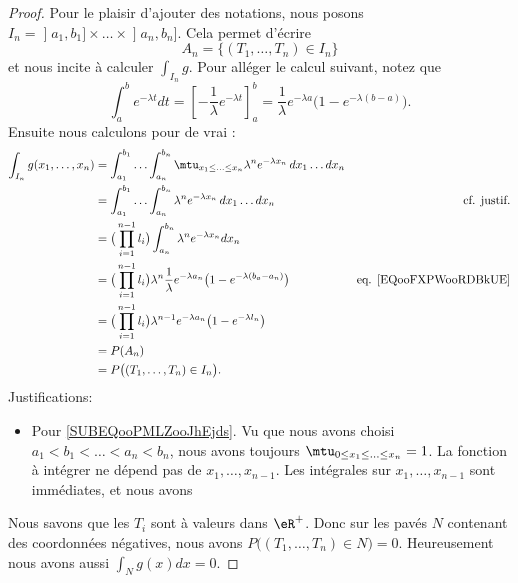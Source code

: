 \begin{proof}
	Pour le plaisir d'ajouter des notations, nous posons \( I_n=\mathopen] a_1 , b_1 \mathclose]\times \ldots\times\mathopen] a_n , b_n \mathclose]\). Cela permet d'écrire
	\begin{equation}
		A_n=\{ (T_1,\ldots,T_n)\in I_n \}
	\end{equation}
	et nous incite à calculer \( \int_{I_n}g\). Pour alléger le calcul suivant, notez que
	\begin{equation}	\label{EQooFXPWooRDBkUE}
		\int_a^be^{-\lambda t}dt=\left[  -\frac{1}{ \lambda}e^{-\lambda t}  \right]_a^b=\frac{1}{ \lambda}e^{-\lambda a}\big( 1-e^{-\lambda(b-a)} \big).
	\end{equation}
	Ensuite nous calculons pour de vrai :
	\begin{subequations}
		\begin{align}
			\int_{I_n}g(x_1,\ldots, x_n) & =\int_{a_1}^{b_1}\ldots\int_{a_n}^{b_n}\mtu_{x_1\leq \ldots\leq x_n}\lambda^n e^{-\lambda x_n}\,dx_1\ldots dx_n                                                 \\
			                             & =\int_{a_1}^{b_1}\ldots\int_{a_n}^{b_n}\lambda^n e^{-\lambda x_n}\,dx_1\ldots dx_n                              & \text{cf. justif.}\label{SUBEQooPMLZooJhEjds} \\
			                             & =\big( \prod_{i=1}^{n-1}l_i \big)\int_{a_n}^{b_n}\lambda^ne^{-\lambda x_n}dx_n                                                                                  \\
			                             & =\big( \prod_{i=1}^{n-1}l_i \big)\lambda^n\frac{1}{ \lambda}e^{-\lambda a_n}\big(1- e^{-\lambda(b_a-a_n)} \big) & \text{eq. \eqref{EQooFXPWooRDBkUE}}           \\
			                             & =\big( \prod_{i=1}^{n-1}l_i \big)\lambda^{n-1}e^{-\lambda a_n}\big(1- e^{-\lambda l_n} \big)                                                                    \\
			                             & =P(A_n)                                                                                                                                                         \\
			                             & =P\big( (T_1,\ldots, T_n)\in I_n \big).
		\end{align}
	\end{subequations}
	Justifications:
	\begin{itemize}
		\item Pour \eqref{SUBEQooPMLZooJhEjds}. Vu que nous avons choisi \( a_1<b_1<\ldots<a_n<b_n\), nous avons toujours \( \mtu_{0\leq x_1\leq\ldots\leq x_n}=1\). La fonction à intégrer ne dépend pas de \( x_1,\ldots,x_{n-1}\).
		      Les intégrales sur \( x_1,\ldots, x_{n-1}\) sont immédiates, et nous avons
	\end{itemize}
	Nous savons que les \( T_i\) sont à valeurs dans \( \eR^+\). Donc sur les pavés \( N\) contenant des coordonnées négatives, nous avons \( P\big( (T_1,\ldots, T_n)\in N \big)=0 \). Heureusement nous avons aussi \( \int_Ng(x)dx=0\).


\end{proof}
